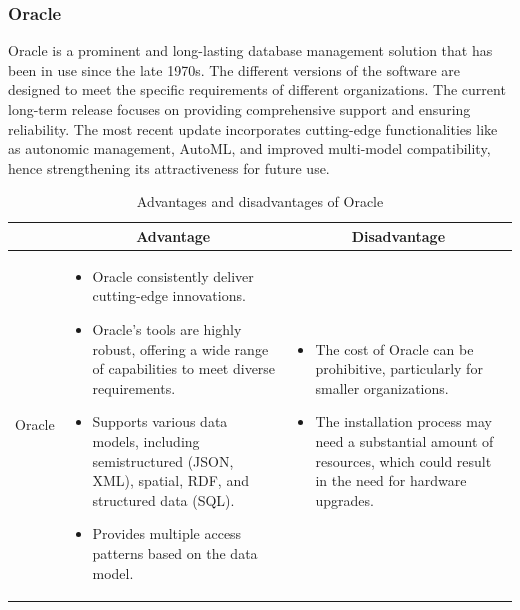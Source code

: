 \subsubsection{Oracle}

Oracle is a prominent and long-lasting database management solution that has been in use since the late 1970s. The different versions of the software are designed to meet the specific requirements of different organizations. The current long-term release focuses on providing comprehensive support and ensuring reliability. The most recent update incorporates cutting-edge functionalities like as autonomic management, AutoML, and improved multi-model compatibility, hence strengthening its attractiveness for future use.

\begin{table}[H]
    \centering
    \begin{tabular}{| c | p{} | p{} |}
        \hline
        \multicolumn{1}{|c|}{}
        & \multicolumn{1}{c|}{Advantage}
        & \multicolumn{1}{c|}{Disadvantage} \\ \hline
        \multirow{7}{*}{Oracle}     
                &   \begin{itemize}[leftmargin=*,topsep=0pt,partopsep=0pt,parsep=0pt]
                        \item Oracle consistently deliver cutting-edge innovations.
                        \item Oracle's tools are highly robust, offering a wide range of capabilities to meet diverse requirements.
                        \item Supports various data models, including semistructured (JSON, XML), spatial, RDF, and structured data (SQL).
                        \item Provides multiple access patterns based on the data model.
                    \end{itemize}
                &   \begin{itemize}[leftmargin=*,topsep=0pt,partopsep=0pt,parsep=0pt]
                        \item The cost of Oracle can be prohibitive, particularly for smaller organizations.
                        \item The installation process may need a substantial amount of resources, which could result in the need for hardware upgrades.
                    \end{itemize} \\ \hline
    \end{tabular}
    \caption{Advantages and disadvantages of Oracle}
\end{table}


